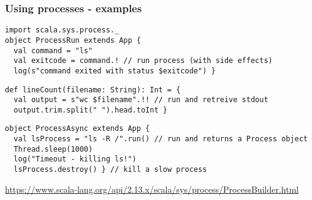 \documentclass[aspectratio=169]{beamer}
\begin{document}
\begin{frame}[fragile]\frametitle{Using processes - examples}
    
\begin{lstlisting}[emph={execute,sleep,log,destroy,!}]
import scala.sys.process._
object ProcessRun extends App {
  val command = "ls"
  val exitcode = command.! // run process (with side effects)
  log(s"command exited with status $exitcode") }
\end{lstlisting}

\begin{lstlisting}[emph={execute,sleep,log,destroy,!}]
def lineCount(filename: String): Int = {
  val output = s"wc $filename".!! // run and retreive stdout
  output.trim.split(" ").head.toInt }
\end{lstlisting}

\begin{lstlisting}[emph={execute,sleep,log,destroy}]
object ProcessAsync extends App {
  val lsProcess = "ls -R /".run() // run and returns a Process object
  Thread.sleep(1000)
  log("Timeout - killing ls!")
  lsProcess.destroy() } // kill a slow process
\end{lstlisting}

{\small\url{https://www.scala-lang.org/api/2.13.x/scala/sys/process/ProcessBuilder.html}}

\end{frame}
\end{document}
